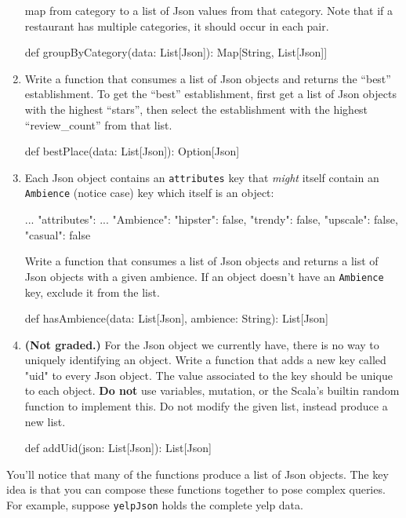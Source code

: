 \begin{enumerate}
    map from category to a list of Json values from that category. Note that if
    a restaurant has multiple categories, it should occur in each pair.
    \begin{scalacode}
    def groupByCategory(data: List[Json]): Map[String, List[Json]]
    \end{scalacode}
    \item Write a function that consumes a list of Json objects and returns the
    ``best'' establishment. To get the ``best'' establishment, first get a list
    of Json objects with the highest ``stars'', then select the establishment
    with the highest ``review\_count'' from that list.
    \begin{scalacode}
    def bestPlace(data: List[Json]): Option[Json]
    \end{scalacode}
    \item Each Json object contains an \texttt{attributes} key that
    \textit{might} itself contain an \texttt{Ambience} (notice case) key which
    itself is an object:
    \begin{scalacode}
    {   ...
        "attributes": {
            ...
            "Ambience": {
                "hipster": false,
                "trendy": false,
                "upscale": false,
                "casual": false
            }
        }
    }
    \end{scalacode}
    Write a function that consumes a list of Json objects and returns a list
    of Json objects with a given ambience. If an object doesn't have an
    \texttt{Ambience} key, exclude it from the list.
    \begin{scalacode}
    def hasAmbience(data: List[Json], ambience: String): List[Json]
    \end{scalacode}
    \item \textbf{(Not graded.)} For the Json object we currently have, there
    is no way to uniquely identifying an object. Write a function that adds a
    new key called "uid" to every Json object. The value associated to the
    key should be unique to each object. \textbf{Do not} use variables,
    mutation, or the Scala's builtin random function to implement this. Do not
    modify the given list, instead produce a new list.
    \begin{scalacode}
    def addUid(json: List[Json]): List[Json]
    \end{scalacode}

\end{enumerate}

\noindent You'll notice that many of the functions produce a list of Json
objects. The key idea is that you can compose these functions together to
pose complex queries. For example, suppose \texttt{yelpJson} holds the
complete yelp data.

